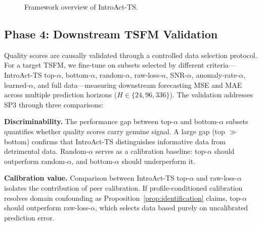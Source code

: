 \documentclass{article}
\begin{document}
\begin{figure}[t]
\centering
{}
\caption{Framework overview of IntroAct-TS.}
\label{fig:framework}
\end{figure}

\subsection{Phase 4: Downstream TSFM Validation}

Quality scores are causally validated through a controlled data selection protocol. For a target TSFM, we fine-tune on subsets selected by different criteria---IntroAct-TS top-$\alpha$, bottom-$\alpha$, random-$\alpha$, raw-loss-$\alpha$, SNR-$\alpha$, anomaly-rate-$\alpha$, learned-$\alpha$, and full data---measuring downstream forecasting MSE and MAE across multiple prediction horizons ($H \in \{24, 96, 336\}$). The validation addresses SP3 through three comparisons:

\textbf{Discriminability.} The performance gap between top-$\alpha$ and bottom-$\alpha$ subsets quantifies whether quality scores carry genuine signal. A large gap (top $\gg$ bottom) confirms that IntroAct-TS distinguishes informative data from detrimental data. Random-$\alpha$ serves as a calibration baseline: top-$\alpha$ should outperform random-$\alpha$, and bottom-$\alpha$ should underperform it.

\textbf{Calibration value.} Comparison between IntroAct-TS top-$\alpha$ and raw-loss-$\alpha$ isolates the contribution of peer calibration. If profile-conditioned calibration resolves domain confounding as Proposition~\ref{prop:identification} claims, top-$\alpha$ should outperform raw-loss-$\alpha$, which selects data based purely on uncalibrated prediction error.
\end{document}
